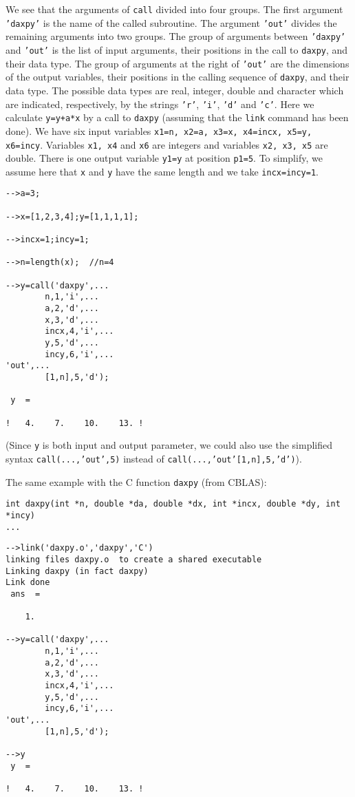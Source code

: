 We see that the arguments of {\tt call}  divided into four groups.
The first argument {\tt 'daxpy'} is the name of the called subroutine.
The argument {\tt 'out'} divides the remaining arguments into two 
groups.  The group of arguments between {\tt 'daxpy'} and {\tt 'out'}
is the list of input arguments, their positions in the call to {\tt daxpy},
and their data type.  The group of arguments at the right of {\tt 'out'}
are the dimensions of the output variables, their positions in the calling
sequence of {\tt daxpy}, and their data type.
The possible data types are real, integer, double and character which
are indicated, respectively, by the strings {\tt 'r'}, {\tt 'i'}, {\tt 'd'}
and {\tt 'c'}.  
Here we calculate {\tt y=y+a*x} by a call to {\tt daxpy} (assuming
that the {\tt link} command has been done).
We have six input variables 
{\tt x1=n, x2=a, x3=x, x4=incx, x5=y, x6=incy}.
Variables {\tt x1, x4} and {\tt x6} are integers and variables
{\tt x2, x3, x5} are double. There is one output variable {\tt y1=y}
at position {\tt p1=5}. To simplify, we assume here that {\tt x} and
{\tt y} have the same length and we take {\tt incx=incy=1}.
\begin{verbatim}
-->a=3;
 
-->x=[1,2,3,4];y=[1,1,1,1];
 
-->incx=1;incy=1;

-->n=length(x);  //n=4

-->y=call('daxpy',...
        n,1,'i',...
        a,2,'d',...
        x,3,'d',...
        incx,4,'i',...
        y,5,'d',...
        incy,6,'i',...
'out',...
        [1,n],5,'d');

 y  =
 
!   4.    7.    10.    13. !
\end{verbatim}
(Since {\tt y} is both input and output parameter, we could also use
the simplified syntax 
{\tt call(...,'out',5)} instead of {\tt call(...,'out'[1,n],5,'d')}). 

The same example with the C function {\tt daxpy} (from CBLAS):
\begin{verbatim}
int daxpy(int *n, double *da, double *dx, int *incx, double *dy, int *incy)
...
\end{verbatim}

\begin{verbatim}
-->link('daxpy.o','daxpy','C')
linking files daxpy.o  to create a shared executable
Linking daxpy (in fact daxpy)
Link done
 ans  =
 
    1.  

-->y=call('daxpy',...
        n,1,'i',...
        a,2,'d',...
        x,3,'d',...
        incx,4,'i',...
        y,5,'d',...
        incy,6,'i',...
'out',...
        [1,n],5,'d');
 
-->y
 y  =
 
!   4.    7.    10.    13. !
\end{verbatim}

